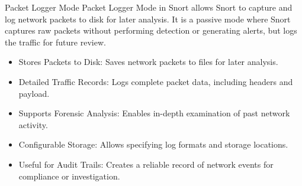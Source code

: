 \begin{frame}[t]{Packet Logger Mode}
  \fontsize{11.5}{14}\selectfont
  \vspace{0.1cm}
  Packet Logger Mode in Snort allows Snort to capture and log network packets to disk for later analysis. It is a passive mode where Snort captures raw packets without performing detection or generating alerts, but logs the traffic for future review.
  \vspace{0.12cm}
  \begin{itemize}
    \item \textcolor{WarningColor}{Stores Packets to Disk:} Saves network packets to files for later analysis.
    \item \textcolor{WarningColor}{Detailed Traffic Records:} Logs complete packet data, including headers and payload.
    \item \textcolor{WarningColor}{Supports Forensic Analysis:} Enables in-depth examination of past network activity.
    \item \textcolor{WarningColor}{Configurable Storage:} Allows specifying log formats and storage locations.
    \item \textcolor{WarningColor}{Useful for Audit Trails:} Creates a reliable record of network events for compliance or investigation.
  \end{itemize}
\end{frame}
